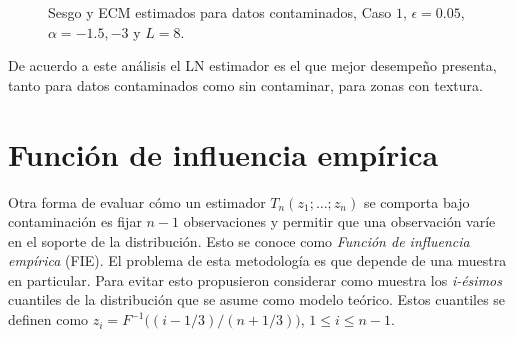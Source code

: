 \begin{figure}[htb]
	\caption{\label{SesgoyECMConContL=8-1punto5y-3}\small Sesgo y ECM estimados para datos contaminados, Caso $1$, $\epsilon=0.05$, $\alpha=-1.5, -3$ y $ L=8$.}
\end{figure}
De acuerdo a este análisis el LN estimador es el que mejor desempeño presenta, tanto para datos contaminados como sin contaminar, para zonas con textura.

\section{Función de influencia empírica}
\label{FIES}

Otra forma de evaluar cómo un estimador $T_n(z_1; \ldots ; z_n)$ se comporta bajo contaminación es fijar $n-1$ observaciones y permitir que una observación varíe en el soporte de la distribución. Esto se conoce como \textit{Función de influencia empírica} (FIE). El problema de esta metodología es que depende de una muestra en particular. Para evitar esto \citet{Andrews1972} propusieron considerar como muestra los \textit{i-ésimos} cuantiles de la distribución que se asume como modelo teórico. Estos cuantiles se definen como $z_i=F^{-1}\big((i-1/3)/(n+1/3) \big)$, $1\leq i\leq n-1$.

